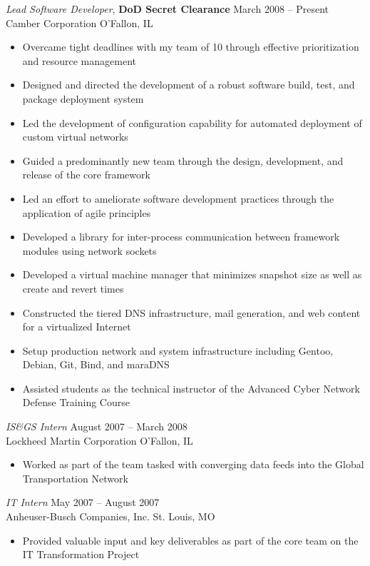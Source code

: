 \documentclass[margin,line]{resume}
\begin{document}
\begin{resume}
{\sl Lead Software Developer}, \textbf{\small DoD Secret Clearance}   \hfill  March 2008 -- Present\\
Camber Corporation                                                    \hfill  O'Fallon, IL
\begin{itemize} \itemsep -2pt %
\small\item Overcame tight deadlines with my team of 10 through effective prioritization and resource management
\small\item Designed and directed the development of a robust software build, test, and package deployment system
\small\item Led the development of configuration capability for automated deployment of custom virtual networks
\small\item Guided a predominantly new team through the design, development, and release of the core framework
\small\item Led an effort to ameliorate software development practices through the application of agile principles
\small\item Developed a library for inter-process communication between framework modules using network sockets
\small\item Developed a virtual machine manager that minimizes snapshot size as well as create and revert times
\small\item Constructed the tiered DNS infrastructure, mail generation, and web content for a virtualized Internet
\small\item Setup production network and system infrastructure including Gentoo, Debian, Git, Bind, and maraDNS
\small\item Assisted students as the technical instructor of the Advanced Cyber Network Defense Training Course
\end{itemize}

{\sl IS\&GS Intern}                 \hfill  August 2007 -- March 2008\\
Lockheed Martin Corporation         \hfill  O'Fallon, IL
\begin{itemize} \itemsep -2pt %
\small\item Worked as part of the team tasked with converging data feeds into the Global Transportation Network
\end{itemize}

{\sl IT Intern}                     \hfill  May 2007 -- August 2007\\
Anheuser-Busch Companies, Inc.      \hfill  St. Louis, MO
\begin{itemize} \itemsep -2pt %
\small\item Provided valuable input and key deliverables as part of the core team on the IT Transformation Project
\end{itemize}


\end{resume}
\end{document}
